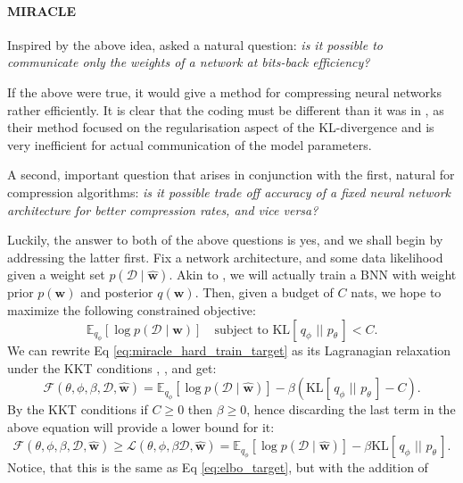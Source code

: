 \documentclass{article}
\renewcommand{\vec}[1]{\mathbf{#1}}
\renewcommand{\L}{\mathcal{L}}
\newcommand{\F}{\mathcal{F}}
\newcommand{\KL}[2]{\mathrm{KL}[\,#1\,\,||\,\,#2\,]}
\newcommand{\Exp}{\mathbb{E}}
\newcommand{\Data}{\mathcal{D}}
\begin{document}
\paragraph{MIRACLE}
Inspired by the above idea, \cite{havasi2018minimal} asked a natural question:
\textit{is it possible to communicate only the weights of a network at
  bits-back efficiency?}
\par
If the above were true, it would give a method for compressing neural networks
rather efficiently. It is clear that the coding must be different than it was in
\cite{hinton1993keeping}, as their method focused on the regularisation aspect
of the KL-divergence and is very inefficient for actual communication of the
model parameters.
\par
A second, important question that arises in conjunction with the first, natural
for compression algorithms:
\textit{is it possible trade off accuracy of a fixed neural network architecture
  for better compression rates, and vice versa?}
\par
Luckily, the answer to both of the above questions is yes, and we shall begin by
addressing the latter first. Fix a network architecture, and some data
likelihood given a weight set $p(\Data \mid \vec{\hat{w}})$. Akin to
\cite{hinton1993keeping}, we will actually train a BNN with weight prior
$p(\vec{w})$ and posterior $q(\vec{w})$. Then, given a budget of $C$ nats, we
hope to maximize the following constrained objective:
\begin{equation}
\label{eq:miracle_hard_train_target}
\Exp_{q_\phi}[\log p(\Data \mid \vec{w})] \quad \text{subject to }
\KL{q_{\phi}}{p_{\theta}} < C.
\end{equation}
We can rewrite Eq \ref{eq:miracle_hard_train_target} as its Lagranagian
relaxation under the KKT conditions \cite{karush2014minima},
\cite{kuhn2014nonlinear}, \cite{higgins2017beta} and get:
\[
  \F(\theta, \phi, \beta, \Data, \vec{\hat{w}}) = 
  \Exp_{q_\phi}[\log p(\Data \mid \vec{\hat{w}})] - \beta (\KL{q_{\phi}}{p_{\theta}} - C).
\]
By the KKT conditions if $C \geq 0$ then $\beta \geq 0$, hence discarding the last
term in the above equation will provide a lower bound for it:
\begin{equation}
\label{eq:miracle_train_target}
\F(\theta, \phi, \beta, \Data, \vec{\hat{w}}) \geq
\L(\theta, \phi, \beta \Data, \vec{\hat{w}}) =
\Exp_{q_\phi}[\log p(\Data \mid \vec{\hat{w}})] - \beta \KL{q_{\phi}}{p_{\theta}}.
\end{equation}
Notice, that this is the same as Eq \ref{eq:elbo_target}, but with the addition of
\end{document}
